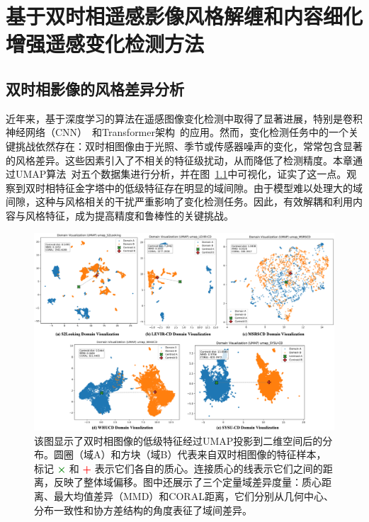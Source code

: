 
\chapter{基于双时相遥感影像风格解缠和内容细化增强遥感变化检测方法}
\section{双时相影像的风格差异分析}
近年来，基于深度学习的算法在遥感图像变化检测中取得了显著进展，特别是卷积神经网络（CNN）~\cite{Chen2020DASNetDA,Fang2021SNUNetCDAD}和Transformer架构~\cite{chen_remote_2022,zhang_swinsunet_2022}的应用。然而，变化检测任务中的一个关键挑战依然存在：双时相图像由于光照、季节或传感器噪声的变化，常常包含显著的风格差异。这些因素引入了不相关的特征级扰动，从而降低了检测精度。本章通过UMAP算法~\cite{McInnes2018UMAPUM}对五个数据集进行分析，并在图~\ref{fig:domain_vis}中可视化，证实了这一点。观察到双时相特征金字塔中的低级特征存在明显的域间隙。由于模型难以处理大的域间隙，这种与风格相关的干扰严重影响了变化检测任务。因此，有效解耦和利用内容与风格特征，成为提高精度和鲁棒性的关键挑战。


\begin{figure}[!htb]
	\centering
	\includegraphics[width=\textwidth]{paper_figures/基于双时相遥感影像风格解缠和内容细化增强遥感变化检测方法/domain_vis.png}
	\caption{该图显示了双时相图像的低级特征经过UMAP投影到二维空间后的分布。圆圈（域A）和方块（域B）代表来自双时相图像的特征样本，标记 \textcolor{green}{\textbf{×}} 和 \textcolor{red}{\textbf{+}} 表示它们各自的质心。连接质心的线表示它们之间的距离，反映了整体域偏移。图中还展示了三个定量域差异度量：质心距离、最大均值差异（MMD）和CORAL距离，它们分别从几何中心、分布一致性和协方差结构的角度表征了域间差异。}
	\label{fig:domain_vis}
\end{figure}



